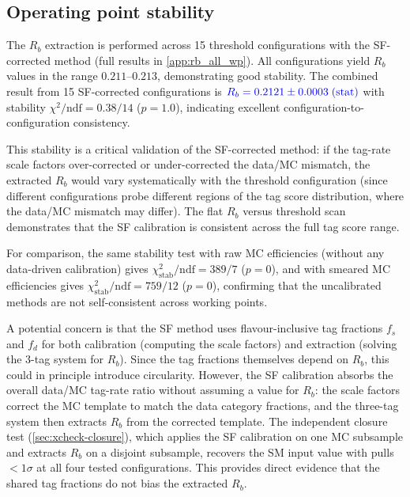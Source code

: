 \documentclass[11pt,a4paper]{article}
\newcommand{\measured}[1]{\textcolor{blue}{#1}}
\begin{document}
\subsection{Operating point stability}
\label{sec:xcheck-stability}

The $R_b$ extraction is performed across 15 threshold configurations
with the SF-corrected method
(full results in \cref{app:rb_all_wp}).
All configurations yield $R_b$ values in the range $0.211$--$0.213$,
demonstrating good stability.
The combined result from 15 SF-corrected configurations is
$\measured{R_b = 0.2121 \pm 0.0003\;\text{(stat)}}$
with stability $\chi^2/\text{ndf} = 0.38/14$ ($p = 1.0$),
indicating excellent configuration-to-configuration consistency.

This stability is a critical validation of the SF-corrected method:
if the tag-rate scale factors over-corrected or under-corrected the
data/MC mismatch, the extracted $R_b$ would vary systematically with
the threshold configuration (since different configurations probe
different regions of the tag score distribution, where the data/MC
mismatch may differ).
The flat $R_b$ versus threshold scan demonstrates that the
SF calibration is consistent across the full tag score range.

For comparison, the same stability test with raw MC efficiencies
(without any data-driven calibration) gives
$\chi^2_\text{stab}/\text{ndf} = 389/7$ ($p = 0$),
and with smeared MC efficiencies gives
$\chi^2_\text{stab}/\text{ndf} = 759/12$ ($p = 0$),
confirming that the uncalibrated methods are not self-consistent
across working points.

A potential concern is that the SF method uses flavour-inclusive
tag fractions $f_s$ and $f_d$ for both calibration (computing the
scale factors) and extraction (solving the 3-tag system for $R_b$).
Since the tag fractions themselves depend on $R_b$, this could in
principle introduce circularity.
However, the SF calibration absorbs the overall data/MC tag-rate
ratio without assuming a value for $R_b$: the scale factors correct
the MC template to match the data category fractions, and the
three-tag system then extracts $R_b$ from the corrected template.
The independent closure test (\cref{sec:xcheck-closure}), which
applies the SF calibration on one MC subsample and extracts $R_b$
on a disjoint subsample, recovers the SM input value with pulls
$< 1\sigma$ at all four tested configurations.
This provides direct evidence that the shared tag fractions do not
bias the extracted $R_b$.
\end{document}
